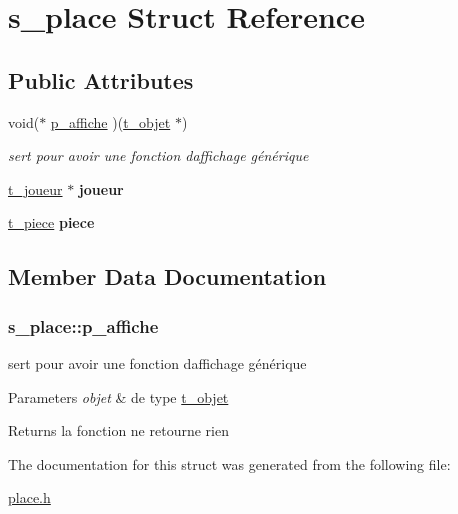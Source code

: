\hypertarget{structs__place}{}\section{s\+\_\+place Struct Reference}
\label{structs__place}
\subsection*{Public Attributes}
\begin{DoxyCompactItemize}
\item 
void($\ast$ \hyperlink{structs__place_a3876d28b2a22e373f0f820d723ef4dbd}{p\+\_\+affiche} )(\hyperlink{structt__objet}{t\+\_\+objet} $\ast$)
\begin{DoxyCompactList}\small\item\em sert pour avoir une fonction d\textquotesingle{}affichage générique \end{DoxyCompactList}\item 
\hyperlink{structt__joueur}{t\+\_\+joueur} $\ast$ {\bfseries joueur}\hypertarget{structs__place_a26ca4dd2cdea77b6ee35ea17ae421276}{}\label{structs__place_a26ca4dd2cdea77b6ee35ea17ae421276}

\item 
\hyperlink{joueur_8h_abaae233af7d7c466ecddef6f4567ea1f}{t\+\_\+piece} {\bfseries piece}\hypertarget{structs__place_af5aa0e667018aa18e2c199d59e4273cd}{}\label{structs__place_af5aa0e667018aa18e2c199d59e4273cd}

\end{DoxyCompactItemize}


\subsection{Member Data Documentation}
\subsubsection[{\texorpdfstring{p\+\_\+affiche}{p_affiche}}]{\setlength{\rightskip}{0pt plus 5cm}s\+\_\+place\+::p\+\_\+affiche}\hypertarget{structs__place_a3876d28b2a22e373f0f820d723ef4dbd}{}\label{structs__place_a3876d28b2a22e373f0f820d723ef4dbd}


sert pour avoir une fonction d\textquotesingle{}affichage générique 


\begin{DoxyParams}{Parameters}
{\em objet} & de type \hyperlink{structt__objet}{t\+\_\+objet} \\
\hline
\end{DoxyParams}
\begin{DoxyReturn}{Returns}
la fonction ne retourne rien 
\end{DoxyReturn}


The documentation for this struct was generated from the following file\+:\begin{DoxyCompactItemize}
\item 
\hyperlink{place_8h}{place.\+h}\end{DoxyCompactItemize}

